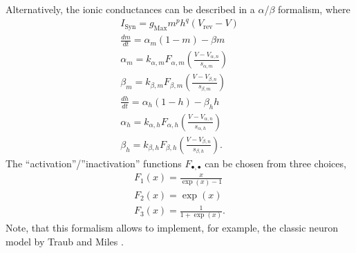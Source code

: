 \documentclass{article}
\begin{document}
\noindent
Alternatively, the ionic conductances can be described in a
$\alpha$/$\beta$ formalism, where
\begin{align}
I_{\text{Syn}}= g_{\text{Max}} m^p h^q (V_{\text{rev}}-V) \\
\frac{dm}{dt}= \alpha_m (1-m) - \beta m \\
\alpha_m= k_{\alpha,m} F_{\alpha,m}\left(\frac{V-V_{\alpha,n}}{s_{\alpha,m}}
\right) \\
\beta_m= k_{\beta,m} F_{\beta,m}\left(\frac{V-V_{\beta,n}}{s_{\beta,m}}
\right) \\
\frac{dh}{dt}= \alpha_h (1 - h) - \beta_h h \\
\alpha_h= k_{\alpha,h} F_{\alpha,h}\left(\frac{V-V_{\alpha,n}}{s_{\alpha,h}}
\right) \\
\beta_h= k_{\beta,h} F_{\beta,h}\left(\frac{V-V_{\beta,n}}{s_{\beta,h}}
\right).
\end{align}
The ``activation''/''inactivation'' functions $F_{\bullet , \bullet}$ can
be chosen from three choices,
\begin{align}
F_1(x)= \frac{x}{\exp(x)-1} \\
F_2(x)= \exp(x) \\
F_3(x)= \frac{1}{1+\exp(x)}.
\end{align}
Note, that this formalism allows to implement, for example, the classic
neuron model by Traub and Miles \cite{Traub1991}. \\
\end{document}
